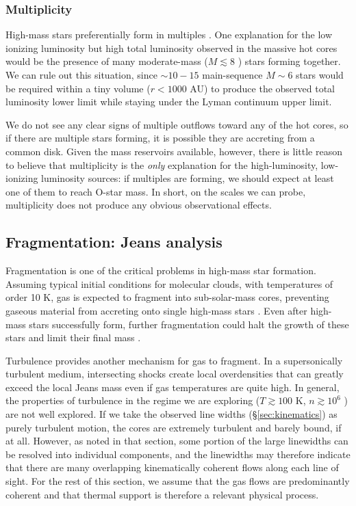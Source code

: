 \documentclass{emulateapj}
\begin{document}
\subsubsection{Multiplicity}
High-mass stars preferentially form in multiples \citep{Zinnecker2007a}.  One
explanation for the low ionizing luminosity but high total luminosity observed
in the massive hot cores would be the presence of many moderate-mass
($M\lesssim8$ \msun) stars forming together.  We can rule out this situation,
since $\sim10-15$ main-sequence $M\sim6$ \msun stars would be required within a
tiny volume ($r<1000$ AU) to produce the observed total luminosity lower limit
while staying under the Lyman continuum upper limit.


We do not see any clear signs of multiple outflows toward any of the hot cores,
so if there are multiple stars forming, it is possible they are accreting from
a common disk.
Given the mass reservoirs available, however, there is little reason
to believe that multiplicity is the \emph{only} explanation for the
high-luminosity, low-ionizing luminosity sources: if multiples are forming, we
should expect at least one of them to reach O-star mass.  In short, on the
scales we can probe, multiplicity does not produce any obvious observational
effects.



\subsection{Fragmentation: Jeans analysis}
\label{sec:fragmentation}
Fragmentation is one of the critical problems in high-mass star formation.
Assuming typical initial conditions for molecular clouds, with temperatures of
order 10 K, gas is expected to fragment into sub-solar-mass cores, preventing gaseous
material from accreting onto single high-mass stars \citep{Krumholz2015a}.
Even after high-mass stars successfully form, further fragmentation could
halt the growth of these stars and limit their final mass
\citep{Peters2010a,Girichidis2012b}.

Turbulence provides another mechanism for gas to fragment.  In a supersonically
turbulent medium, intersecting shocks create local overdensities that can
greatly exceed the local Jeans mass even if gas temperatures are quite high.
In general, the properties of turbulence in the regime we are exploring
($T\gtrsim100$ K, $n\gtrsim10^6$ \percc) are not well explored.  If we take the
observed line widths (\S \ref{sec:kinematics}) as purely turbulent motion, the
cores are extremely turbulent and barely bound, if at all.  However, as noted
in that section, some portion of the large linewidths can be resolved into
individual components, and the linewidths may therefore indicate that there are
many overlapping kinematically coherent flows along each line of sight.  For
the rest of this section, we assume that the gas flows are predominantly
coherent and that thermal support is therefore a relevant physical process.
\end{document}
